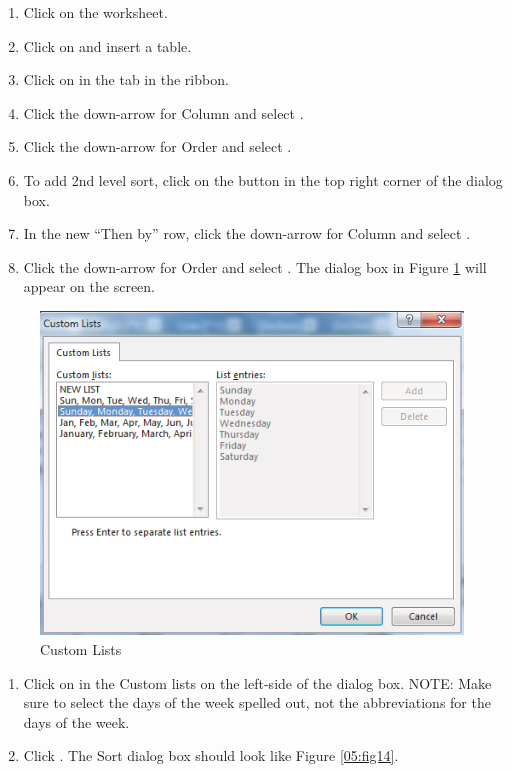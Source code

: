 \begin{enumerate}
	\item Click on the  worksheet.
	\item Click on  and insert a table.
	\item Click on  in the  tab in the ribbon.
	\item Click the down-arrow for Column and select .
	\item Click the down-arrow for Order and select .
	\item To add 2nd level sort, click on the  button in the top right corner of the dialog box.
	\item In the new ``Then by'' row, click the down-arrow for Column and select .
	\item Click the down-arrow for Order and select . The dialog box in Figure \ref{05:fig13} will appear on the screen.
\end{enumerate}

\begin{figure}[H]
	\centering
	\includegraphics[width=\maxwidth{.95\linewidth}]{gfx/ch05_fig13}
	\caption{Custom Lists}
	\label{05:fig13}
\end{figure}

\begin{enumerate}[resume]
	\item Click on  in the Custom lists on the left-side of the dialog box. NOTE: Make sure to select the days of the week spelled out, not the abbreviations for the days of the week.
	\item Click . The Sort dialog box should look like Figure \ref{05:fig14}.
\end{enumerate}

